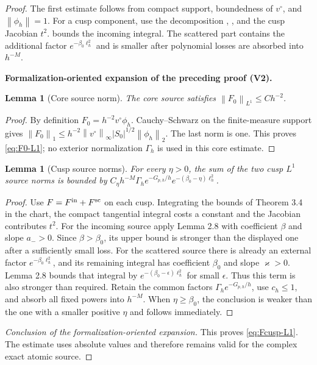 \documentclass[11pt]{article}
\newtheorem{lemma}[theorem]{Lemma}
\newcommand{\formalisationparentid}{X}
\newenvironment{formalisationaddition}[1]{\par\medskip\begingroup\color{blue}\def\formalisationparentid{#1}\setcounter{formalizationsublemma}{0}\let\lemma\formalizationsublemma\let\endlemma\endformalizationsublemma
  \def\Eo{\mathcal E_h^\circ}\def\EE{\mathcal E_h}\def\phio{\phi_h^\circ}\def\phih{\phi_h}\def\Ho{H_h^{\rm atom}(v^\circ)}\def\Ha{H_h^{\rm atom}}\def\HL{H_h^{L}}\def\Dh{D_h}\def\Log{\operatorname{Log}}\def\ellh{\ell_h}\def\Gp{G_{p,h}}\def\Ast{A_{*,h}}\def\ahat{\widehat{\mathfrak a}_h}\def\ah{\mathfrak a_h}\def\rh{\widehat\rho_h}\def\deltah{\widehat\delta_h}\def\oldref##1{\textup{(##1)}}\def\interface##1{\par\noindent\textit{Analytical interface used here.} ##1\par}\def\finish{\par\noindent\textit{Conclusion of the formalization-oriented expansion.} }\par\noindent\textbf{Formalization-oriented expansion of the preceding proof (V2).}\par\smallskip
}{\par\endgroup\medskip
}
\newcommand{\norm}[1]{\left\|#1\right\|}
\begin{document}
\begin{proof}
The first estimate follows from compact support, boundedness of $v^\circ$,
and $\norm{\phi_h}=1$.  For a cusp component, use the decomposition
, , and the cusp Jacobian
$t^2$.   bounds the incoming integral.  The scattered
part contains the additional factor $e^{-\beta_0\ell_h^2}$ and is smaller
after polynomial losses are absorbed into $h^{-M}$.

\begin{formalisationaddition}{L5.6}
\begin{lemma}[Core source norm]\label{sublemma:L5-6-core-source}
The core source satisfies $\norm{F_0}_{L^1}\le Ch^{-2}$.
\end{lemma}
\begin{proof}
By definition $F_0=h^{-2}v^\circ\phih$. Cauchy--Schwarz on the finite-measure support gives
$\norm{F_0}_1\le h^{-2}\norm{v^\circ}_\infty|S_0|^{1/2}\norm{\phih}_2$.
The last norm is one. This proves \eqref{eq:F0-L1}; no exterior normalization $\Gamma_h$ is used in this core estimate.
\end{proof}

\begin{lemma}[Cusp source norms]\label{sublemma:L5-6-cusp-source}
For every $\eta>0$, the sum of the two cusp $L^1$ source norms is bounded by
$C_\eta h^{-M}\Gamma_he^{-G_{p,h}/h}e^{-(\beta_0-\eta)\ell_h^2}$.
\end{lemma}
\begin{proof}
Use $F=F^{\rm in}+F^{\rm sc}$ on each cusp. Integrating the bounds of Theorem 3.4 in the chart, the compact tangential integral costs a constant and the Jacobian contributes $t^2$.
For the incoming source apply Lemma 2.8 with coefficient $\beta$ and slope $a_->0$. Since $\beta>\beta_0$, its upper bound is stronger than the displayed one after a sufficiently small loss.
For the scattered source there is already an external factor $e^{-\beta_0\ell_h^2}$, and its remaining integral has coefficient $\beta_0$ and slope $\varkappa>0$. Lemma 2.8 bounds that integral by $e^{-(\beta_0-\epsilon)\ell_h^2}$ for small $\epsilon$. Thus this term is also stronger than required. Retain the common factors $\Gamma_he^{-G_{p,h}/h}$, use $c_h\le1$, and absorb all fixed powers into $h^{-M}$. When $\eta\ge\beta_0$, the conclusion is weaker than the one with a smaller positive $\eta$ and follows immediately.
\end{proof}
\finish This proves \eqref{eq:Fcusp-L1}. The estimate uses absolute values and therefore remains valid for the complex exact atomic source.
\end{formalisationaddition}

\end{proof}
\end{document}
